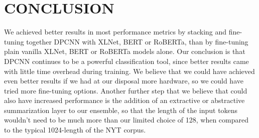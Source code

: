 \documentclass{article}
\begin{document}
\section{CONCLUSION} \label{conclusion_section}

We achieved better results in most performance metrics by stacking and fine-tuning together DPCNN with XLNet, BERT or RoBERTa, than by fine-tuning plain vanilla XLNet, BERT or RoBERTa models alone. Our conclusion is that DPCNN continues to be a powerful classification tool, since better results came with little time overhead during training. We believe that we could have achieved even better results if we had at our disposal more hardware, so we could have tried more fine-tuning options. Another further step that we believe that could also have increased performance is the addition of an extractive or abstractive summarization layer to our ensemble, so that the length of the input tokens wouldn't need to be much more than our limited choice of 128, when compared to the typical 1024-length of the NYT corpus.     
\end{document}
